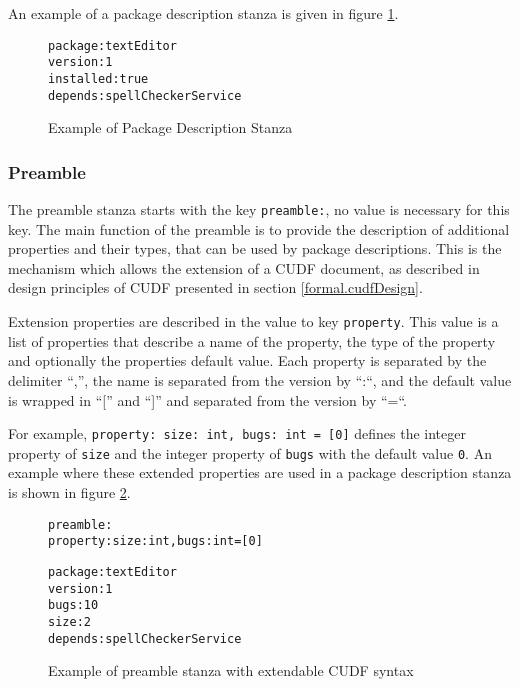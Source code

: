 An example of a package description stanza is given in figure \ref{formal.cudfpdstanza}.
\begin{figure}[htp] 
\begin{center}
\begin{alltt}
package: textEditor
version: 1
installed: true
depends: spellCheckerService
\end{alltt}
  \caption{Example of Package Description Stanza}
  \label{formal.cudfpdstanza}
\end{center}
\end{figure}

\subsubsection{Preamble}
\label{cudf.preambledes}
The preamble stanza starts with the key \verb+preamble:+, no value is necessary for this key.
The main function of the preamble is to provide the description of additional properties and their types, that can be used by package descriptions.
This is the mechanism which allows the extension of a CUDF document, as described in design principles of CUDF presented in section \ref{formal.cudfDesign}.

Extension properties are described in the value to key \verb+property+.
This value is a list of properties that describe a name of the property, the type of the property and optionally the properties default value.
Each property is separated by the delimiter ``,'', the name is separated from the version by ``:``, and the default value is wrapped in ``['' and ``]'' and separated from the version by ``=``.

For example, \verb+property: size: int, bugs: int = [0]+ defines the integer property of \verb+size+ and the integer property of \verb+bugs+ with the default value \verb+0+.
An example where these extended properties are used in a package description stanza is shown in figure \ref{formal.cudfextensionexample}.

\begin{figure}[htp] 
\begin{center}
\begin{alltt}
preamble:
property: size: int, bugs: int = [0]

package: textEditor
version: 1
bugs: 10
size: 2
depends: spellCheckerService

\end{alltt}
  \caption{Example of preamble stanza with extendable CUDF syntax}
  \label{formal.cudfextensionexample}
\end{center}
\end{figure}

